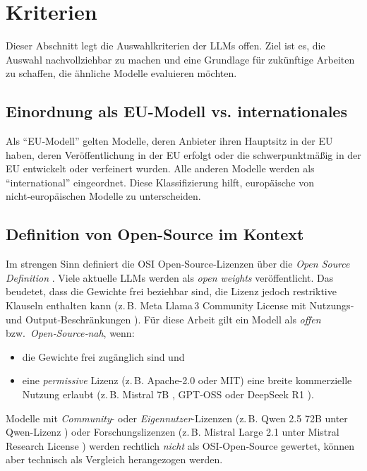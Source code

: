 \section{Kriterien}\label{sec:kriterien}

Dieser Abschnitt legt die Auswahlkriterien der \acp{LLM} offen. Ziel ist es, die Auswahl nachvollziehbar zu machen und eine Grundlage für zukünftige Arbeiten zu schaffen, die ähnliche Modelle evaluieren möchten.

\subsection*{Einordnung als \ac{EU}-Modell vs. internationales}

Als \enquote{\ac{EU}‑Modell} gelten Modelle, deren Anbieter ihren Hauptsitz in der \ac{EU} haben, deren Veröffentlichung in der \ac{EU} erfolgt oder die schwerpunktmäßig in der \ac{EU} entwickelt oder verfeinert wurden. Alle anderen Modelle werden als \enquote{international} eingeordnet. Diese Klassifizierung hilft, europäische von nicht‑europäischen Modelle zu unterscheiden.

\subsection*{Definition von Open-Source im Kontext}

Im strengen Sinn definiert die \ac{OSI} Open‑Source‑Lizenzen über die \emph{Open Source Definition} \cite{OSI_OSD}. Viele aktuelle \acp{LLM} werden als \emph{open weights} veröffentlicht. Das beudetet, dass die Gewichte frei beziehbar sind, die Lizenz jedoch restriktive Klauseln enthalten kann (z.\,B. Meta Llama\,3 Community License mit Nutzungs‑ und Output‑Beschränkungen \cite{Llama3_License}). Für diese Arbeit gilt ein Modell als \emph{offen} bzw.\ \emph{Open‑Source‑nah}, wenn:

\begin{itemize}
    \item die Gewichte frei zugänglich sind und
    \item eine \emph{permissive} Lizenz (z.\,B. Apache‑2.0 oder MIT) eine breite kommerzielle Nutzung erlaubt (z.\,B. Mistral 7B \cite{HF_Mistral7B_2025}, GPT‑OSS \cite{OpenAI_GPTOSS_ModelCard_2025, OpenAI_GPTOSS_Blog_2025} oder DeepSeek R1 \cite{HF_DeepSeekR1_2025}).
\end{itemize}

Modelle mit \emph{Community}- oder \emph{Eigennutzer}-Lizenzen (z.\,B. Qwen 2.5 72B unter Qwen-Lizenz \cite{Qwen72B_License,Qwen_Blog_2024}) oder Forschungslizenzen (z.\,B. Mistral Large 2.1 unter Mistral Research License \cite{MRL_Research_License}) werden rechtlich \emph{nicht} als \ac{OSI}‑Open‑Source gewertet, können aber technisch als Vergleich herangezogen werden.

